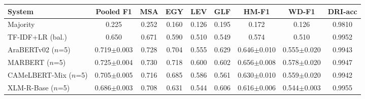\begin{tabular}{lcccccccc}
\toprule
\textbf{System} & \textbf{Pooled F1} & \textbf{MSA} & \textbf{EGY} & \textbf{LEV} & \textbf{GLF} & \textbf{HM-F1} & \textbf{WD-F1} & \textbf{DRI-acc} \\
\midrule
Majority & 0.225 & 0.252 & 0.160 & 0.126 & 0.195 & 0.172 & 0.126 & 0.9810 \\
TF-IDF+LR (bal.) & 0.650 & 0.671 & 0.590 & 0.510 & 0.549 & 0.574 & 0.510 & 0.9952 \\
\midrule
AraBERTv02 ($n$=5) & 0.719$\pm$0.003 & 0.728 & 0.704 & 0.555 & 0.629 & 0.646$\pm$0.010 & 0.555$\pm$0.020 & 0.9943 \\
MARBERT ($n$=5) & 0.725$\pm$0.004 & 0.730 & 0.718 & 0.600 & 0.602 & 0.656$\pm$0.008 & 0.578$\pm$0.020 & 0.9947 \\
CAMeLBERT-Mix ($n$=5) & 0.705$\pm$0.005 & 0.716 & 0.685 & 0.586 & 0.561 & 0.630$\pm$0.010 & 0.559$\pm$0.020 & 0.9942 \\
XLM-R-Base ($n$=5) & 0.686$\pm$0.003 & 0.708 & 0.631 & 0.544 & 0.606 & 0.616$\pm$0.006 & 0.544$\pm$0.003 & 0.9955 \\
\bottomrule
\end{tabular}
